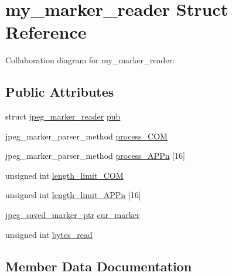 \hypertarget{structmy__marker__reader}{}\section{my\+\_\+marker\+\_\+reader Struct Reference}
\label{structmy__marker__reader}


Collaboration diagram for my\+\_\+marker\+\_\+reader\+:
\subsection*{Public Attributes}
\begin{DoxyCompactItemize}
\item 
struct \hyperlink{structjpeg__marker__reader}{jpeg\+\_\+marker\+\_\+reader} \hyperlink{structmy__marker__reader_ac0d8a24c85575d304ef4383e8f6ca5fc}{pub}
\item 
jpeg\+\_\+marker\+\_\+parser\+\_\+method \hyperlink{structmy__marker__reader_a5e10e69e117d23840f04d54e7a3cdde5}{process\+\_\+\+C\+O\+M}
\item 
jpeg\+\_\+marker\+\_\+parser\+\_\+method \hyperlink{structmy__marker__reader_a3a466da71db30199ab019a03960013cc}{process\+\_\+\+A\+P\+Pn} \mbox{[}16\mbox{]}
\item 
unsigned int \hyperlink{structmy__marker__reader_aa17938db027aceb539d880b78841826e}{length\+\_\+limit\+\_\+\+C\+O\+M}
\item 
unsigned int \hyperlink{structmy__marker__reader_a029e9f21bc02a21c1a26d3c0d7158098}{length\+\_\+limit\+\_\+\+A\+P\+Pn} \mbox{[}16\mbox{]}
\item 
\hyperlink{jpeglib_8h_a2efb5205b3e81589f2dc133f1a412bb0}{jpeg\+\_\+saved\+\_\+marker\+\_\+ptr} \hyperlink{structmy__marker__reader_a861ef3029e1690b4345a8ceb3975e8df}{cur\+\_\+marker}
\item 
unsigned int \hyperlink{structmy__marker__reader_ada1054ee3408bbfcacdddb27af8d9754}{bytes\+\_\+read}
\end{DoxyCompactItemize}


\subsection{Member Data Documentation}
\hypertarget{structmy__marker__reader_ada1054ee3408bbfcacdddb27af8d9754}{}
